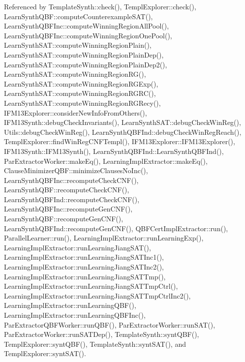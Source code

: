 Referenced by Template\-Synth\-::check(), Templ\-Explorer\-::check(), Learn\-Synth\-Q\-B\-F\-::compute\-Counterexample\-S\-A\-T(), Learn\-Synth\-Q\-B\-F\-Inc\-::compute\-Winning\-Region\-All\-Pool(), Learn\-Synth\-Q\-B\-F\-Inc\-::compute\-Winning\-Region\-One\-Pool(), Learn\-Synth\-S\-A\-T\-::compute\-Winning\-Region\-Plain(), Learn\-Synth\-S\-A\-T\-::compute\-Winning\-Region\-Plain\-Dep(), Learn\-Synth\-S\-A\-T\-::compute\-Winning\-Region\-Plain\-Dep2(), Learn\-Synth\-S\-A\-T\-::compute\-Winning\-Region\-R\-G(), Learn\-Synth\-S\-A\-T\-::compute\-Winning\-Region\-R\-G\-Exp(), Learn\-Synth\-S\-A\-T\-::compute\-Winning\-Region\-R\-G\-R\-C(), Learn\-Synth\-S\-A\-T\-::compute\-Winning\-Region\-R\-G\-Recy(), I\-F\-M13\-Explorer\-::consider\-New\-Info\-From\-Others(), I\-F\-M13\-Synth\-::debug\-Check\-Invariants(), Learn\-Synth\-S\-A\-T\-::debug\-Check\-Win\-Reg(), Utils\-::debug\-Check\-Win\-Reg(), Learn\-Synth\-Q\-B\-F\-Ind\-::debug\-Check\-Win\-Reg\-Reach(), Templ\-Explorer\-::find\-Win\-Reg\-C\-N\-F\-Templ(), I\-F\-M13\-Explorer\-::\-I\-F\-M13\-Explorer(), I\-F\-M13\-Synth\-::\-I\-F\-M13\-Synth(), Learn\-Synth\-Q\-B\-F\-Ind\-::\-Learn\-Synth\-Q\-B\-F\-Ind(), Par\-Extractor\-Worker\-::make\-Eq(), Learning\-Impl\-Extractor\-::make\-Eq(), Clause\-Minimizer\-Q\-B\-F\-::minimize\-Clauses\-No\-Inc(), Learn\-Synth\-Q\-B\-F\-Inc\-::recompute\-Check\-C\-N\-F(), Learn\-Synth\-Q\-B\-F\-::recompute\-Check\-C\-N\-F(), Learn\-Synth\-Q\-B\-F\-Ind\-::recompute\-Check\-C\-N\-F(), Learn\-Synth\-Q\-B\-F\-Inc\-::recompute\-Gen\-C\-N\-F(), Learn\-Synth\-Q\-B\-F\-::recompute\-Gen\-C\-N\-F(), Learn\-Synth\-Q\-B\-F\-Ind\-::recompute\-Gen\-C\-N\-F(), Q\-B\-F\-Cert\-Impl\-Extractor\-::run(), Parallel\-Learner\-::run(), Learning\-Impl\-Extractor\-::run\-Learning\-Exp(), Learning\-Impl\-Extractor\-::run\-Learning\-Jiang\-S\-A\-T(), Learning\-Impl\-Extractor\-::run\-Learning\-Jiang\-S\-A\-T\-Inc1(), Learning\-Impl\-Extractor\-::run\-Learning\-Jiang\-S\-A\-T\-Inc2(), Learning\-Impl\-Extractor\-::run\-Learning\-Jiang\-S\-A\-T\-Tmp(), Learning\-Impl\-Extractor\-::run\-Learning\-Jiang\-S\-A\-T\-Tmp\-Ctrl(), Learning\-Impl\-Extractor\-::run\-Learning\-Jiang\-S\-A\-T\-Tmp\-Ctrl\-Inc2(), Learning\-Impl\-Extractor\-::run\-Learning\-Q\-B\-F(), Learning\-Impl\-Extractor\-::run\-Learning\-Q\-B\-F\-Inc(), Par\-Extractor\-Q\-B\-F\-Worker\-::run\-Q\-B\-F(), Par\-Extractor\-Worker\-::run\-S\-A\-T(), Par\-Extractor\-Worker\-::run\-S\-A\-T\-Dep(), Template\-Synth\-::synt\-Q\-B\-F(), Templ\-Explorer\-::synt\-Q\-B\-F(), Template\-Synth\-::synt\-S\-A\-T(), and Templ\-Explorer\-::synt\-S\-A\-T().

